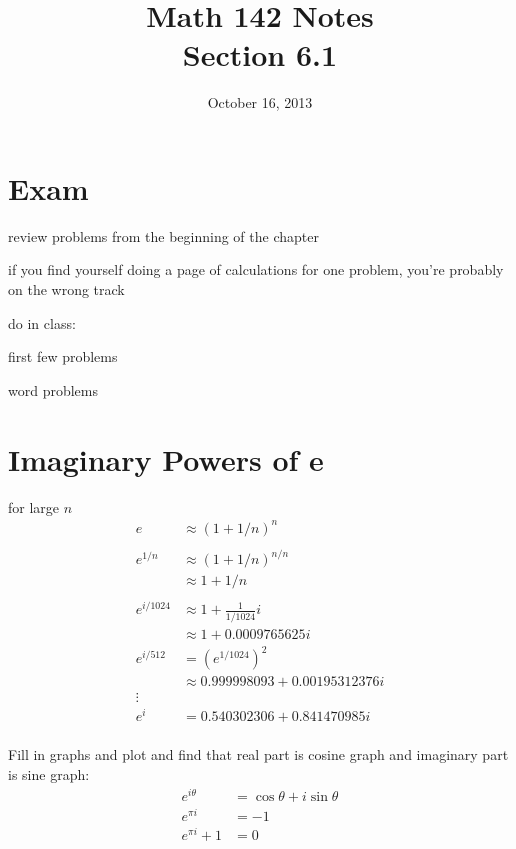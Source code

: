 \documentclass{exam}
\title{Math 142 Notes \\ Section 6.1}
\date{October 16, 2013}
\begin{document}
  \maketitle
  \tableofcontents

  \section{Exam}
  \begin{itemize*}
    \item review problems from the beginning of the chapter
    \item if you find yourself doing a page of calculations for one problem, you're probably on the wrong track
    \item do in class: 
      \begin{itemize*}
        \item first few problems
        \item word problems
      \end{itemize*}
  \end{itemize*}

  \section{Imaginary Powers of e}

  for large $n$
  \begin{align*}
    e       & \approx \left( 1 + 1/n \right)^n \\
    \\
    e^{1/n} & \approx \left( 1 + 1/n \right)^{n/n} \\
            & \approx 1 + 1/n \\
    \\
    e^{i/1024} & \approx 1 + \frac{1}{1/1024} i \\
               & \approx 1 + 0.0009765625 i \\
    e^{i/512}  & = \left( e^{1/1024} \right)^2 \\
               & \approx 0.999998093 + 0.00195312376 i \\
    \vdots \\
    e^{i} &= 0.540302306 + 0.841470985 i \\
  \end{align*}

  Fill in graphs and plot and find that real part is cosine graph and imaginary part is sine graph:
  \begin{align*}
    e^{i \theta}  & = \cos \theta + i \sin \theta \\
    e^{\pi i}     & = -1 \\
    e^{\pi i} + 1 & = 0 \\
  \end{align*}
\end{document}
